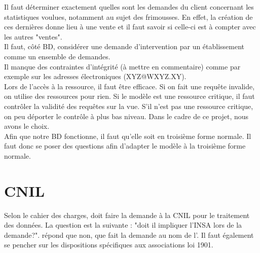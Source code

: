 \documentclass [a4paper] {article}
\begin{document}
Il faut déterminer exactement quelles sont les demandes du client concernant les statistiques voulues, notamment au sujet des frimousses. En effet, la création de ces dernières donne lieu à une vente et il faut savoir si celle-ci est à compter avec les autres "ventes".\\
Il faut, côté BD, considérer une demande d'intervention par un établissement comme un ensemble de demandes.\\
Il manque des contraintes d'intégrité (à mettre en commentaire) comme par exemple sur les adresses électroniques (XYZ@WXYZ.XY).\\
Lors de l'accès à la ressource, il faut être efficace. Si on fait une requête invalide, on utilise des ressources pour rien. Si le modèle est une ressource critique, il faut contrôler la validité des requêtes sur la vue. S'il n'est pas une ressource critique, on peu déporter le contrôle à plus bas niveau. Dans le cadre de ce projet, nous avons le choix.\\
Afin que notre BD fonctionne, il faut qu'elle soit en troisième forme normale. Il faut donc se poser des questions afin d'adapter le modèle à la troisième forme normale.

\section{CNIL}
Selon le cahier des charges, \Sergi{} doit faire la demande à la CNIL pour le traitement des données. La question est la suivante : "doit il impliquer l'INSA lors de la demande?". \nomTuteurPedago{} répond que non, que \Sergi{} fait la demande au nom de l'\nomClient{}. Il faut également se pencher sur les dispositions spécifiques aux associations loi 1901.


\newpage
\end{document}
